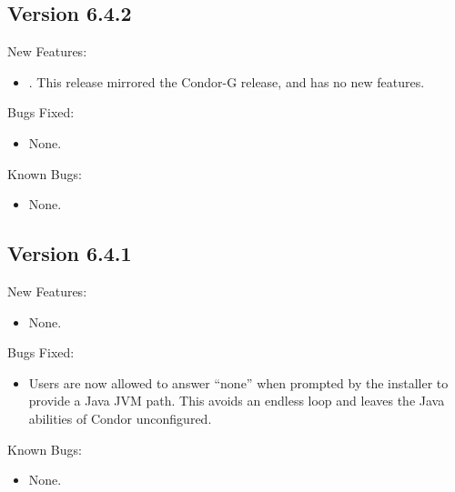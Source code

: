 \subsection{\label{sec:New-6-4-2}Version 6.4.2}
\noindent New Features:
\begin{itemize}

\item. This release mirrored the Condor-G release, and has no new features.

\end{itemize}

\noindent Bugs Fixed:
\begin{itemize}
\item None.

\end{itemize}
\noindent Known Bugs:
\begin{itemize}

\item None.

\end{itemize}

\subsection{\label{sec:New-6-4-1}Version 6.4.1}
\noindent New Features:
\begin{itemize}

\item None.

\end{itemize}

\noindent Bugs Fixed:
\begin{itemize}

\item Users are now allowed to answer ``none'' when prompted by the
installer to provide a Java JVM path. This avoids an endless loop and
leaves the Java abilities of Condor unconfigured.

\end{itemize}

\noindent Known Bugs:
\begin{itemize}

\item None.

\end{itemize}

